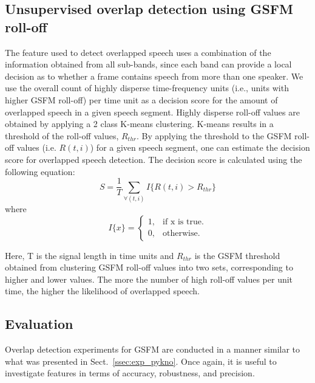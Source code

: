 {\subsection{Unsupervised overlap detection using GSFM roll-off}
\label{sssec:unsupervised_ovl_det_gsfm}
The feature used to detect overlapped speech uses a combination of the information obtained from all sub-bands, since each band can provide a local decision as to whether a frame contains speech from more than one speaker. 
We use the overall count of highly disperse time-frequency units (i.e., units with higher GSFM roll-off) per time unit as a decision score for the amount of overlapped speech in a given speech segment. 
Highly disperse roll-off values are obtained by applying a 2 class K-means clustering. 
K-means results in a threshold of the roll-off values, $R_{thr}$. 
By applying the threshold to the GSFM roll-off values (i.e. $R(t, i)$) for a given speech segment, one can estimate the decision score for overlapped speech detection. 
The decision score is calculated using the following equation:
\begin{equation}
\label{eq:gsfm_features}
S = \frac{1}{T}\sum\limits_{\forall (t,i)} I\{R(t,i) > R_{thr}\}
\end{equation}
where
\begin{equation}
I\{x\}=\begin{cases}
1, & \text{if x is true}.\\
0, & \text{otherwise}.
\end{cases}
\end{equation}

Here, T is the signal length in time units and $R_{thr}$ is the GSFM threshold obtained from clustering GSFM roll-off values into two sets, corresponding to higher and lower values. 
The more the number of high roll-off values per unit time, the higher the likelihood of overlapped speech. 

\subsection{Evaluation}
\label{ssec:exp_gsfm}
Overlap detection experiments for GSFM are conducted in a manner similar to what was presented in Sect.~\ref{ssec:exp_pykno}. 
Once again, it is useful to investigate features in terms of accuracy, robustness, and precision. 

\vspace{3mm}
}
